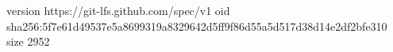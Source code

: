 version https://git-lfs.github.com/spec/v1
oid sha256:5f7e61d49537e5a8699319a8329642d5ff9f86d55a5d517d38d14e2df2bfe310
size 2952
